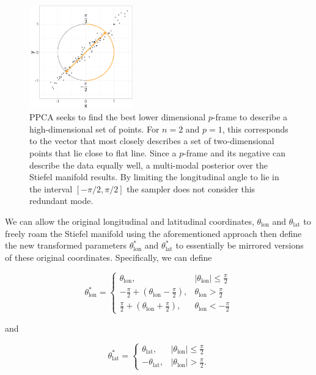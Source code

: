 \documentclass[ba]{imsart}
\numberwithin{equation}{section}
\theoremstyle{plain}
\begin{document}
\begin{figure}[h]
\centering
\vspace{.1in}
\includegraphics[width=0.4\textwidth]{figures/limiting_pca.png}
\vspace{.05in}
\caption{PPCA seeks to find the best lower dimensional $p$-frame to describe a high-dimensional set of points. For $n = 2$ and $p=1$, this corresponds to the vector that most closely describes a set of two-dimensional points that lie close to flat line. Since a $p$-frame and its negative can describe the data equally well, a multi-modal posterior over the Stiefel manifold results. By limiting the longitudinal angle to lie in the interval $[-\pi/2, \pi/2]$ the sampler does not consider this redundant mode.}
\label{fig:limiting_pca}
\end{figure}

\noindent We can allow the original longitudinal and latitudinal coordinates, $\theta_\mathrm{lon}$ and $\theta_\mathrm{lat}$ to freely roam the Stiefel manifold using the aforementioned approach then define the new transformed parameters $\theta_\mathrm{lon}^*$ and $\theta_\mathrm{lat}^*$ to essentially be mirrored versions of these original coordinates. Specifically, we can define

\begin{equation}
\theta_\mathrm{lon}^*
=
\begin{cases}
\theta_\mathrm{lon},& |\theta_\mathrm{lon}| \le \frac{\pi}{2}\\
-\frac{\pi}{2}+(\theta_\mathrm{lon}-\frac{\pi}{2}),& \theta_\mathrm{lon} > \frac{\pi}{2}\\
\frac{\pi}{2}+(\theta_\mathrm{lon}+\frac{\pi}{2}),& \theta_\mathrm{lon} < -\frac{\pi}{2}
\end{cases}
\end{equation}

and

\begin{equation}
\theta_\mathrm{lat}^*
=
\begin{cases}
\theta_\mathrm{lat},& |\theta_\mathrm{lon}| \le \frac{\pi}{2}\\
-\theta_\mathrm{lat},& |\theta_\mathrm{lon}| > \frac{\pi}{2}.
\end{cases}
\end{equation}
\end{document}
